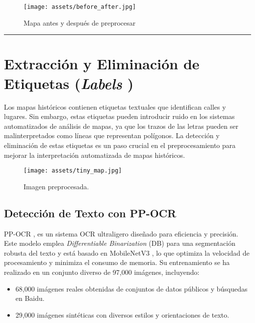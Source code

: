\documentclass[twocolumn, fontsize=10pt]{article}
\begin{document}
  \begin{figure}[H]
    \centering
    \texttt{[image: assets/before\_after.jpg]}
    \caption{Mapa antes y después de preprocesar}
    \label{fig:before_after}
\end{figure}

\rule{\linewidth}{0.5pt}
\section{Extracción y Eliminación de Etiquetas (\textit{Labels })}

Los mapas históricos contienen etiquetas textuales que identifican calles y lugares. Sin embargo, estas etiquetas pueden introducir ruido en los sistemas automatizados de análisis de mapas, ya que los trazos de las letras pueden ser malinterpretados como líneas que representan polígonos. La detección y eliminación de estas etiquetas es un paso crucial en el preprocesamiento para mejorar la interpretación automatizada de mapas históricos.

\begin{figure}[H]
    \centering
    \texttt{[image: assets/tiny\_map.jpg]}
    \caption{Imagen preprocesada.}
    \label{fig:tiny_map}
\end{figure}

\subsection{Detección de Texto con PP-OCR}
PP-OCR \cite{ocr}, es un sistema OCR ultraligero diseñado para eficiencia y precisión. Este modelo emplea \textit{Differentiable Binarization} (DB) \cite{diffbin} para una segmentación robusta del texto y está basado en MobileNetV3 \cite{mobilenet}, lo que optimiza la velocidad de procesamiento y minimiza el consumo de memoria. Su entrenamiento se ha realizado en un conjunto diverso de 97,000 imágenes, incluyendo:
\begin{itemize}
    \item 68,000 imágenes reales obtenidas de conjuntos de datos públicos y búsquedas en Baidu.
    \item 29,000 imágenes sintéticas con diversos estilos y orientaciones de texto.
\end{itemize}
\end{document}
